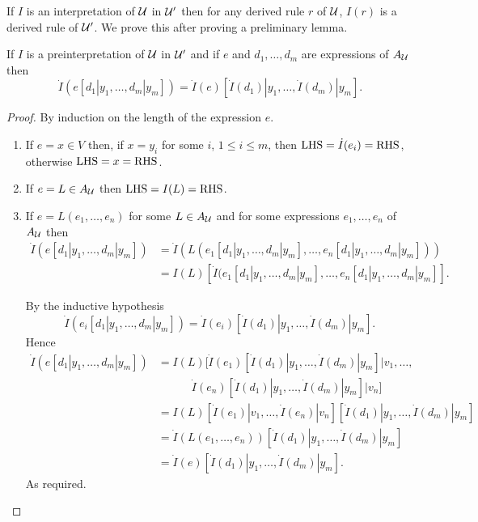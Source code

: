 If $I$ is an interpretation of $\mathcal{U}$ in $\mathcal{U}'$ then for any derived rule $r$ of $\mathcal{U}$, $I(r)$  is a derived rule of $\mathcal{U}'$.
%
We prove this after proving a preliminary lemma.

\begin{lemma}[1]
  If $I$ is a preinterpretation of $\mathcal{U}$ in $\mathcal{U}'$ and if $e$ and $d_1,\ldots,d_m$ are expressions of $A_{\mathcal{U}}$ then
  \[
    \dot I(e[d_1|y_1,\ldots,d_m|y_m]) = \dot I(e)[\dot I(d_1)|y_1,\ldots,\dot I(d_m)|y_m].
  \]
\end{lemma}
\begin{proof} By induction on the length of the expression $e$.

  \begin{enumerate}
    \item If $e=x\in V$ then, if $x = y_i$ for some $i$, $1\leq i\leq m$, then $\text{LHS} = \dot I(e_i) = \text{RHS}$, otherwise $\text{LHS} = x = \text{RHS}$.

    \item If $e = L\in A_{\mathcal{U}}$ then $\text{LHS} = I(L) = \text{RHS}$.

    \item If $e = L(e_1,\ldots,e_n)$ for some $L\in A_{\mathcal{U}}$ and for some expressions $e_1,\ldots,e_n$ of $A_{\mathcal{U}}$ then
      \begin{align*}
        \dot I(e[d_1|y_1,\ldots,d_m|y_m])
        &= \dot I(L(e_1[d_1|y_1,\ldots,d_m|y_m],\ldots,e_n[d_1|y_1,\ldots,d_m|y_m])) \\
        &= I(L)[\dot I(e_1[d_1|y_1,\ldots,d_m|y_m],\ldots,e_n[d_1|y_1,\ldots,d_m|y_m]].
        \end{align*}

        By the inductive hypothesis
        \[\dot I(e_i[d_1|y_1,\ldots,d_m|y_m]) = \dot I(e_i)[\dot I(d_1)|y_1,\ldots,\dot I(d_m)|y_m].\]
        Hence
        \begin{align*}
          \dot I(e[d_1|y_1,\ldots,d_m|y_m])
          &= I(L)[\dot I(e_1)[\dot I(d_1)|y_1,\ldots,\dot I(d_m)|y_m]|v_1,\ldots,\\
          &\qquad\quad\dot I(e_n)[\dot I(d_1)|y_1,\ldots,\dot I(d_m)|y_m]|v_n]\\
          &= I(L)[\dot I(e_1)|v_1,\ldots,\dot I(e_n)|v_n][\dot I(d_1)|y_1,\ldots,\dot I(d_m)|y_m]\\
          &= \dot I(L(e_1,\ldots,e_n))[\dot I(d_1)|y_1,\ldots,\dot I(d_m)|y_m]\\
          &= \dot I(e)[\dot I(d_1)|y_1,\ldots,\dot I(d_m)|y_m].
        \end{align*}
        As required.
    \end{enumerate}
  \end{proof}


